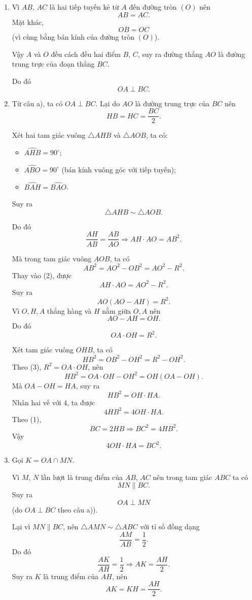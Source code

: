 \begin{bt}[3,0 điểm]
{	\begin{enumerate}
	\item Vì $AB$, $AC$ là hai tiếp tuyến kẻ từ $A$ đến đường tròn $(O)$ nên
	\[
	AB=AC.
	\]
	Mặt khác,
	\[
	OB=OC
	\]
	(vì cùng bằng bán kính của đường tròn $(O)$).
	
	Vậy $A$ và $O$ đều cách đều hai điểm $B$, $C$, suy ra đường thẳng $AO$ là đường trung trực của đoạn thẳng $BC$.
	
	Do đó
	\[
	OA\perp BC.
	\]
	
	\item Từ câu a), ta có $OA\perp BC$. Lại do $AO$ là đường trung trực của $BC$ nên
	\[
	HB=HC=\dfrac{BC}{2}. \tag{1}
	\]
	
	Xét hai tam giác vuông $\triangle AHB$ và $\triangle AOB$, ta có:
	\begin{itemize}
	\item $\widehat{AHB}=90^\circ$;
	\item $\widehat{ABO}=90^\circ$ (bán kính vuông góc với tiếp tuyến);
	\item $\widehat{BAH}=\widehat{BAO}$.
	\end{itemize}
	Suy ra
	\[
	\triangle AHB \sim \triangle AOB.
	\]
	
	Do đó
	\[
	\dfrac{AH}{AB}=\dfrac{AB}{AO}
	\Rightarrow AH\cdot AO=AB^2. \tag{2}
	\]
	
	Mà trong tam giác vuông $AOB$, ta có
	\[
	AB^2=AO^2-OB^2=AO^2-R^2.
	\]
	Thay vào (2), được
	\[
	AH\cdot AO=AO^2-R^2.
	\]
	Suy ra
	\[
	AO(AO-AH)=R^2.
	\]
	Vì $O,H,A$ thẳng hàng và $H$ nằm giữa $O,A$ nên
	\[
	AO-AH=OH.
	\]
	Do đó
	\[
	OA\cdot OH=R^2. \tag{3}
	\]
	
	Xét tam giác vuông $OHB$, ta có
	\[
	HB^2=OB^2-OH^2=R^2-OH^2.
	\]
	Theo (3), $R^2=OA\cdot OH$, nên
	\[
	HB^2=OA\cdot OH-OH^2=OH(OA-OH).
	\]
	Mà $OA-OH=HA$, suy ra
	\[
	HB^2=OH\cdot HA.
	\]
	Nhân hai vế với $4$, ta được
	\[
	4HB^2=4OH\cdot HA.
	\]
	Theo (1),
	\[
	BC=2HB \Rightarrow BC^2=4HB^2.
	\]
	Vậy
	\[
	4OH\cdot HA=BC^2.
	\]
	
	\item Gọi $K=OA\cap MN$.
	
	Vì $M$, $N$ lần lượt là trung điểm của $AB$, $AC$ nên trong tam giác $ABC$ ta có
	\[
	MN\parallel BC.
	\]
	Suy ra
	\[
	OA\perp MN \tag{4}
	\]
	(do $OA\perp BC$ theo câu a)).
	
	Lại vì $MN\parallel BC$, nên $\triangle AMN \sim \triangle ABC$ với tỉ số đồng dạng
	\[
	\dfrac{AM}{AB}=\dfrac12.
	\]
	Do đó
	\[
	\dfrac{AK}{AH}=\dfrac12
	\Rightarrow AK=\dfrac{AH}{2}.
	\]
	Suy ra $K$ là trung điểm của $AH$, nên
	\[
	AK=KH=\dfrac{AH}{2}. \tag{5}
	\]
	

\end{enumerate}}
\end{bt}
